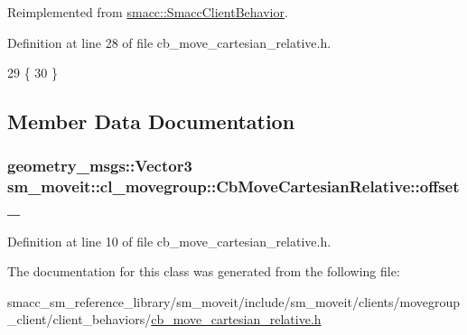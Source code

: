 Reimplemented from \hyperlink{classsmacc_1_1SmaccClientBehavior_ac0cd72d42bd00425362a97c9803ecce5}{smacc\+::\+Smacc\+Client\+Behavior}.



Definition at line 28 of file cb\+\_\+move\+\_\+cartesian\+\_\+relative.\+h.


\begin{DoxyCode}
29     \{
30     \}
\end{DoxyCode}


\subsection{Member Data Documentation}
\subsubsection[{\texorpdfstring{offset\+\_\+}{offset_}}]{\setlength{\rightskip}{0pt plus 5cm}geometry\+\_\+msgs\+::\+Vector3 sm\+\_\+moveit\+::cl\+\_\+movegroup\+::\+Cb\+Move\+Cartesian\+Relative\+::offset\+\_\+}\hypertarget{classsm__moveit_1_1cl__movegroup_1_1CbMoveCartesianRelative_ae6be0657c538de613e203abd9acb761e}{}\label{classsm__moveit_1_1cl__movegroup_1_1CbMoveCartesianRelative_ae6be0657c538de613e203abd9acb761e}


Definition at line 10 of file cb\+\_\+move\+\_\+cartesian\+\_\+relative.\+h.



The documentation for this class was generated from the following file\+:\begin{DoxyCompactItemize}
\item 
smacc\+\_\+sm\+\_\+reference\+\_\+library/sm\+\_\+moveit/include/sm\+\_\+moveit/clients/movegroup\+\_\+client/client\+\_\+behaviors/\hyperlink{cb__move__cartesian__relative_8h}{cb\+\_\+move\+\_\+cartesian\+\_\+relative.\+h}\end{DoxyCompactItemize}
